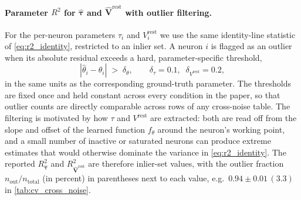 \documentclass{article}
\def\vrest{V^{\mathrm{rest}}}
\begin{document}
\paragraph{Parameter $R^2$ for $\hat{\boldsymbol{\tau}}$ and
$\hat{\mathbf{V}}^{\mathrm{rest}}$ with outlier filtering.}
For the per-neuron parameters $\tau_i$ and $\vrest_i$ we use the same
identity-line statistic of \cref{eq:r2_identity}, restricted to an
inlier set. A neuron $i$ is flagged as an outlier when its absolute
residual exceeds a hard, parameter-specific threshold,
\begin{equation}
    |\hat\theta_i - \theta_i| \;>\; \delta_\theta,
    \qquad
    \delta_\tau = 0.1,\;\;
    \delta_{\vrest} = 0.2,
    \label{eq:outlier_threshold}
\end{equation}
in the same units as the corresponding ground-truth parameter. The
thresholds are fixed once and held constant across every condition in
the paper, so that outlier counts are directly comparable across rows
of any cross-noise table. The filtering is motivated by
how $\tau$ and $\vrest$ are extracted: both are read off from the
slope and offset of the learned function
$f_\theta$ around the neuron's working point, and a small number of
inactive or saturated neurons can produce extreme estimates that
would otherwise dominate the variance in
\cref{eq:r2_identity}. The reported $R^2_{\hat{\boldsymbol{\tau}}}$
and $R^2_{\hat{\mathbf{V}}^{\mathrm{rest}}}$ are therefore
inlier-set values, with the outlier fraction
$n_{\text{out}}/n_{\text{total}}$ (in percent) in parentheses next to
each value, e.g.\ $0.94 \pm 0.01\,(3.3)$ in
\cref{tab:cv_cross_noise}.
\end{document}
